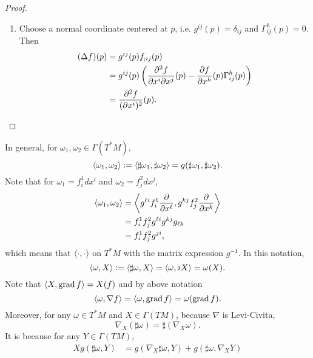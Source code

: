 \begin{proof}
\begin{enumerate}[label=(\arabic{*})]
        \item Choose a normal coordinate centered at $p$, i.e. $g^{ij}(p) = \delta_{ij}$ and $\Gamma^h_{ij}(p) = 0$. Then
        \begin{align*}
            (\Delta f)(p) &= g^{ij}(p)f_{;ij}(p) \\
            &= g^{i j}(p)\left(\frac{\partial^2 f}{\partial x^i \partial x^j}(p)-\frac{\partial f}{\partial x^h}(p) \Gamma_{i j}^h(p)\right) \\
            &= \frac{\partial^2 f}{(\partial x^i)^2}(p). \qedhere
        \end{align*}
    \end{enumerate}
\end{proof}
\begin{rmk}
    In general, for $\omega_1,\omega_2 \in \Gamma(T^*M)$,
    \begin{equation*}
        \left\langle \omega_1,\omega_2 \right\rangle \vcentcolon= \left\langle \sharp \omega_1,\sharp \omega_2 \right\rangle = g(\sharp \omega_1,\sharp \omega_2).
    \end{equation*}
    Note that for $\omega_1 = f_i^1 dx^i$ and $\omega_2 = f_j^2 dx^j$,
    \begin{align*}
        \left\langle \omega_1,\omega_2 \right\rangle &= \left\langle g^{\ell i}f_i^1\frac{\partial}{\partial x^\ell},g^{k j}f_j^2\frac{\partial}{\partial x^k} \right\rangle \\
        &= f_i^1f_j^2g^{\ell i}g^{k j} g_{ \ell k} \\
        &= f_i^1f_j^2g^{ji},
    \end{align*}
    which means that $\left\langle \cdot,\cdot \right\rangle$ on $T^*M$ with the matrix expression $g^{-1}$. In this notation,
    \begin{equation*}
        \left\langle \omega,X \right\rangle \vcentcolon= \left\langle \sharp \omega, X \right\rangle = \left\langle \omega,\flat X \right\rangle = \omega(X).
    \end{equation*}
    Note that $\left\langle X,\operatorname{grad}f \right\rangle = X(f)$ and by above notation
    \begin{equation*}
        \left\langle \omega ,\nabla f \right\rangle = \left\langle \omega, \operatorname{grad} f \right\rangle = \omega(\operatorname{grad} f).
    \end{equation*}
    Moreover, for any $\omega \in T^*M$ and $X \in \Gamma(TM)$, because $\nabla$ is Levi-Civita,
    \begin{equation*}
        \nabla_X(\sharp \omega) = \sharp (\nabla_X \omega).
    \end{equation*}
    It is because for any $Y \in \Gamma(TM)$,
    \begin{align*}
        Xg(\sharp \omega,Y) &= g(\nabla_X \sharp \omega, Y) + g(\sharp \omega, \nabla_X Y) \\

\end{align*}
\end{rmk}
